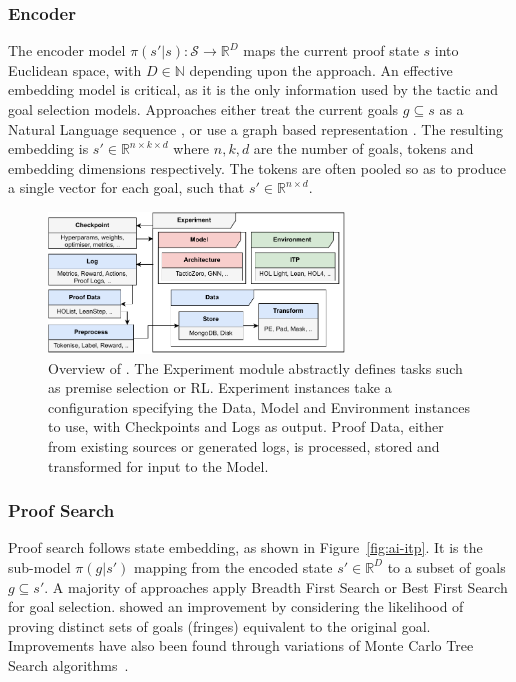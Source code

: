 \documentclass[letterpaper]{article} %
\newcommand{\sysname}{\textsc{\sffamily{Bait}}}
\newcommand\alg[1]{\textsc{\sffamily{#1}}}%
\begin{document}
    \subsubsection{Encoder \label{state_embed}}
    The encoder model $\pi(s' | s): \mathcal{S} \to \mathbb{R}^{D}$
    maps the current proof state $s$ into Euclidean space, with $D \in \mathbb{N}$ depending upon the approach.
    An effective embedding model is critical, as it is the only information used by the tactic and goal selection models.
    Approaches either treat the current goals $g \subseteq s$ as a Natural Language sequence \cite{lample_hypertree_2022, polu_formal_2022, wu_tacticzero_2021}, or use a graph based representation \cite{bansal_learning_2019, paliwal_graph_2020, wang_premise_2017, evans_can_2018}.
    The resulting embedding is $s' \in \mathbb{R}^{n \times k \times d}$ where $n, k, d$ are the number of
    goals, tokens and embedding dimensions respectively.
    The tokens are often pooled so as to produce a single vector for each goal, such that $s' \in \mathbb{R}^{n \times d}$.
    \begin{figure}[htbp]
        \centering
        \includegraphics[width=0.7\textwidth]{bait.pdf}
        \caption{Overview of \sysname{}. The Experiment module abstractly defines tasks such as premise selection or RL.
        Experiment instances take a configuration specifying the Data, Model and Environment instances to use,
            with Checkpoints and Logs as output.
            Proof Data, either from existing sources or generated logs, is processed, stored and transformed for input to the Model.
        }
        \label{fig:framework}
    \end{figure}

    \subsubsection{Proof Search}
    Proof search follows state embedding, as shown in Figure~\ref{fig:ai-itp}.
    It is the sub-model $\pi(g | s')$ mapping from the encoded state $s' \in \mathbb{R}^{ D}$
    to a subset of goals $g \subseteq s'$.
    A majority of approaches apply Breadth First Search \cite{bansal_holist_2019, huang_gamepad_2018} or Best First Search
    for goal selection.
    \alg{TacticZero} \cite{wu_tacticzero_2021} showed an improvement by considering the likelihood of proving distinct sets of goals (fringes)
    equivalent to the original goal.
    Improvements have also been found through variations of Monte Carlo Tree Search algorithms~\cite{lample_hypertree_2022, wu_int_2020}.
\end{document}

